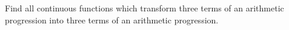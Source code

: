 Find all continuous functions which transform three terms of an arithmetic progression into three terms of an arithmetic progression.
